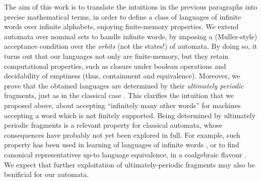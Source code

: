 The aim of this work is to translate the intuitions in the previous paragraphs into precise mathematical terms, in order to define a class of languages of infinite words over infinite alphabets, enjoying finite-memory properties. We extend automata over nominal sets to handle infinite words, by imposing a (Muller-style) acceptance condition 
over the \emph{orbits} (not the states!) of automata. By doing so, it turns out that our languages not only are finite-memory, but they retain computational properties, such as closure under boolean operations and decidability of emptiness (thus, containment and equivalence). Moreover, we prove that the obtained languages are determined by their \emph{ultimately periodic} fragments, just as in the classical case \cite{CalbrixNP93}. This clarifies the intuition that we proposed above, about accepting ``infinitely many other words'' for machines accepting a word which is not finitely supported. 
%
Being determined by ultimately periodic fragments is
a relevant property for classical automata, whose consequences have probably not yet been explored in full.
%
For example, such property has been used in learning of languages of infinite words \cite{Emerson}, or to find canonical representatives up-to language equivalence, in a coalgebraic flavour \cite{CV12}. We expect that further exploitation of ultimately-periodic fragments may also be benificial for 
our automata.%



